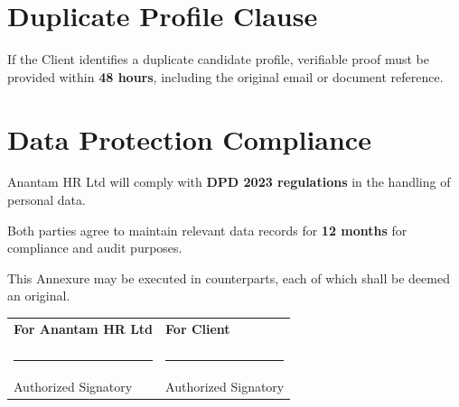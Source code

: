 \documentclass[12pt]{article}
\begin{document}
\section{Duplicate Profile Clause}

If the Client identifies a duplicate candidate profile, verifiable proof must be provided within \textbf{48 hours}, including the original email or document reference.

\section{Data Protection Compliance}

Anantam HR Ltd will comply with \textbf{DPD 2023 regulations} in the handling of personal data.

Both parties agree to maintain relevant data records for \textbf{12 months} for compliance and audit purposes.

\vspace{1cm}

This Annexure may be executed in counterparts, each of which shall be deemed an original.

\vspace{1.5cm}

\begin{tabular}{p{7cm} p{7cm}}

\textbf{For Anantam HR Ltd} & \textbf{For Client} \\

\vspace{2cm} & \vspace{2cm} \\

\rule{6cm}{0.4pt} & \rule{6cm}{0.4pt} \\
Authorized Signatory & Authorized Signatory \\

\end{tabular}
\end{document}

